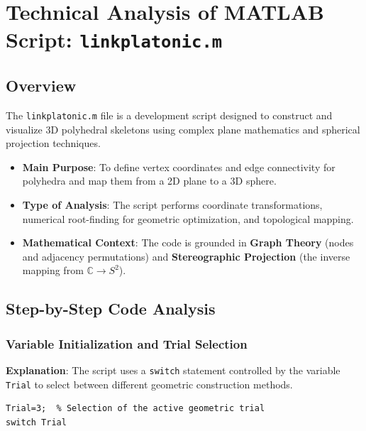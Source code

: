
\chapter{Technical Analysis of MATLAB Script: \texttt{linkplatonic.m}}
\date{}



\maketitle

\section{Overview}

The \texttt{linkplatonic.m} file is a development script designed to construct and visualize 3D polyhedral skeletons using complex plane mathematics and spherical projection techniques.

\begin{itemize}
    \item \textbf{Main Purpose}: To define vertex coordinates and edge connectivity for polyhedra and map them from a 2D plane to a 3D sphere.
    \item \textbf{Type of Analysis}: The script performs coordinate transformations, numerical root-finding for geometric optimization, and topological mapping.
    \item \textbf{Mathematical Context}: The code is grounded in \textbf{Graph Theory} (nodes and adjacency permutations) and \textbf{Stereographic Projection} (the inverse mapping from $\mathbb{C} \to S^2$).
\end{itemize}

\section{Step-by-Step Code Analysis}

\subsection{Variable Initialization and Trial Selection}
\textbf{Explanation}: The script uses a \texttt{switch} statement controlled by the variable \texttt{Trial} to select between different geometric construction methods.

\begin{lstlisting}
Trial=3;  % Selection of the active geometric trial
switch Trial
\end{lstlisting}

